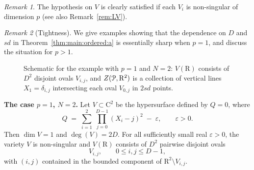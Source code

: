 \documentclass[10pt]{amsart}
\theoremstyle{definition}
\theoremstyle{remark}
\newtheorem{remark}{Remark}
\numberwithin{equation}{section}
\newcommand {\R} {\mathrm{R}}
\newcommand {\D}     {\mbox{\rm D}}
\newcommand {\C}     {\mathrm{C}}
\newcommand {\ZZ} {{\rm Z}}
\newcommand{\x}{\mathbf{x}}
\begin{document}
\begin{remark}
\label{rem:thm:main:ordered:a}
    \label{rem:thm:main:ordered:a:2}
    The hypothesis on $V$ is clearly satisfied if each $V_i$ is non-singular of dimension $p$ (see also Remark~\ref{rem:LV}).
\end{remark}


\begin{remark}[Tightness]
\label{rem:tight:ordered}
We give examples showing that the dependence on $D$ and $sd$ in
Theorem~\ref{thm:main:ordered:a} is essentially sharp when $p=1$, and discuss the
situation for $p>1$.

\begin{figure}[t]
\centering
{}
\caption{Schematic for the example with $p=1$ and $N=2$: $V(\R)$ consists of $D^2$ disjoint ovals $V_{i,j}$, and
$\ZZ(\mathcal P,\R^2)$ is a collection of vertical lines $X_1=\delta_{i,j}$ intersecting each oval $V_{0,j}$ in $2sd$ points.}
\label{fig:example-p1-N2}
\end{figure}

\smallskip
\noindent\textbf{The case $p=1$, $N=2$.}
Let $V\subset \C^2$ be the hypersurface defined by $Q=0$, where
\[
Q \;=\; \sum_{i=1}^{2}\ \prod_{j=0}^{D-1}(X_i-j)^2\;-\;\varepsilon,
\qquad \varepsilon>0 .
\]
Then $\dim V=1$ and $\deg(V)=2D$. For all sufficiently small real $\varepsilon>0$,
the variety $V$ is non-singular and $V(\R)$ consists of $D^2$ pairwise disjoint ovals
\[
V_{i,j},\qquad 0\le i,j\le D-1,
\]
with $(i,j)$ contained in the bounded component of $\R^2\setminus V_{i,j}$.


\end{remark}
\end{document}
